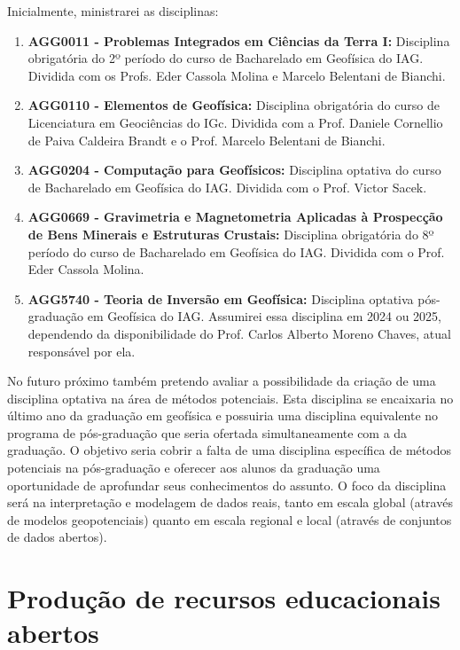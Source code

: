 \documentclass[12pt,a4paper,oneside]{book}
\begin{document}
Inicialmente, ministrarei as disciplinas:

\begin{enumerate}
  \item \textbf{AGG0011 - Problemas Integrados em Ciências da Terra I:}
    Disciplina obrigatória do 2º período do curso de Bacharelado em Geofísica do IAG.
    Dividida com os Profs. Eder Cassola Molina e Marcelo Belentani de
    Bianchi.
  \item \textbf{AGG0110 - Elementos de Geofísica:}
    Disciplina obrigatória do curso de Licenciatura em Geociências do IGc.
    Dividida com a Prof. Daniele Cornellio de Paiva Caldeira Brandt e o Prof.
    Marcelo Belentani de Bianchi.
  \item \textbf{AGG0204 - Computação para Geofísicos:}
    Disciplina optativa do curso de Bacharelado em Geofísica do IAG.
    Dividida com o Prof. Victor Sacek.
  \item \textbf{AGG0669 - Gravimetria e Magnetometria Aplicadas à Prospecção de
    Bens Minerais e Estruturas Crustais:}
    Disciplina obrigatória do 8º período do curso de Bacharelado em Geofísica do IAG.
    Dividida com o Prof. Eder Cassola Molina.
  \item \textbf{AGG5740 - Teoria de Inversão em Geofísica:}
    Disciplina optativa pós-graduação em Geofísica do IAG.
    Assumirei essa disciplina em 2024 ou 2025, dependendo da disponibilidade
    do Prof. Carlos Alberto Moreno Chaves, atual responsável por ela.
\end{enumerate}

No futuro próximo também pretendo avaliar a possibilidade da criação de uma
disciplina optativa na área de métodos potenciais. Esta disciplina se
encaixaria no último ano da graduação em geofísica e possuiria uma disciplina
equivalente no programa de pós-graduação que seria ofertada simultaneamente com
a da graduação. O objetivo seria cobrir a falta de uma disciplina específica de
métodos potenciais na pós-graduação e oferecer aos alunos da graduação uma
oportunidade de aprofundar seus conhecimentos do assunto.
O foco da disciplina será na interpretação e modelagem de dados reais, tanto em
escala global (através de modelos geopotenciais) quanto em escala regional e
local (através de conjuntos de dados abertos).



\section{Produção de recursos educacionais abertos}
\end{document}
